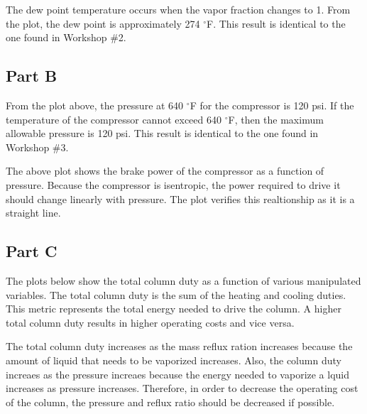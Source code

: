 \documentclass[12pt]{article}
\begin{document}
The dew point temperature occurs when the vapor fraction changes to 1. From the plot, the dew point is approximately 274 $^\circ$F. This result is identical to the one found in Workshop \#2.

\subsection{Part B}

\begin{center}
    
\end{center}

From the plot above, the pressure at 640 $^\circ$F for the compressor is 120 psi. If the temperature of the compressor cannot exceed 640 $^\circ$F, then the maximum allowable pressure is 120 psi. This result is identical to the one found in Workshop \#3.

\begin{center}
    
\end{center}

The above plot shows the brake power of the compressor as a function of pressure. Because the compressor is isentropic, the power required to drive it should change linearly with pressure. The plot verifies this realtionship as it is a straight line. 

\subsection{Part C}

The plots below show the total column duty as a function of various manipulated variables. The total column duty is the sum of the heating and cooling duties. This metric represents the total energy needed to drive the column. A higher total column duty results in higher operating costs and vice versa.

\begin{center}
    
\end{center}

\begin{center}
    
\end{center}

The total column duty increases as the mass reflux ration increases because the amount of liquid that needs to be vaporized increases. Also, the column duty increaes as the pressure increaes because the energy needed to vaporize a lquid increases as pressure increases. Therefore, in order to decrease the operating cost of the column, the pressure and reflux ratio should be decreased if possible.
\end{document}
